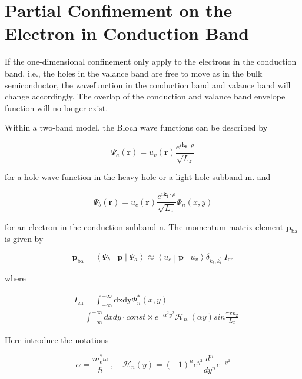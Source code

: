 \section{Partial Confinement on the Electron in Conduction
Band}\label{partial-confinement-on-the-electron-in-conduction-band}

If the one-dimensional confinement only apply to the electrons in the
conduction band, i.e., the holes in the valance band are free to move as
in the bulk semiconductor, the wavefunction in the conduction band and
valance band will change accordingly. The overlap of the conduction and
valance band envelope function will no longer exist.

Within a two-band model, the Bloch wave functions can be described by

\begin{equation}
\Psi_{a}\left( \bm{r} \right) = u_{v}(\bm{r})\frac{e^{i\bm{k}_{\bm{t}} \cdot \rho}}{\sqrt{L_{z}}}
\end{equation}

for a hole wave function in the heavy-hole or a light-hole subband m.
and

\begin{equation}
\Psi_{b}\left( \bm{r} \right) = u_{c}(\bm{r})\frac{e^{i\bm{k}_{\bm{t}} \cdot \rho}}{\sqrt{L_{z}}}\Phi_{n}(x,y)
\end{equation}

for an electron in the conduction subband n. The momentum matrix element
\(\bm{p}_{\text{ba}}\) is given by

\begin{equation}
\bm{p}_{\text{ba}}\bm{=}\left\langle \Psi_{b} \middle| \bm{p} \middle| \Psi_{a} \right\rangle \approx \left\langle u_{c} \middle| \bm{p} \middle| u_{v} \right\rangle\delta_{k_{t},k_{t}^{'}}\ I_{\text{en}}
\end{equation}

where

\begin{eqnarray}
  & I_{\text{en}} = \int_{- \infty}^{+ \infty}{\text{dxdy}\Phi_{n}^{*}\left( x,y \right)} \nonumber \\
  & = \int_{- \infty}^{+ \infty}{dxdy \cdot const \times e^{- \alpha^{2}y^{2}}\mathcal{H}_{n_{1}}(\alpha y)sin\frac{\text{πx}n_{2}}{L_{x}}}
\end{eqnarray}

Here introduce the notations

\begin{equation}
\alpha = \frac{m_{e}^{*}\omega}{\hbar}\ , \quad
\mathcal{H}_{n}\left( y \right) = {( - 1)}^{n}e^{y^{2}}\frac{d^{n}}{dy^{n}}e^{{- y}^{2}}
\end{equation}

